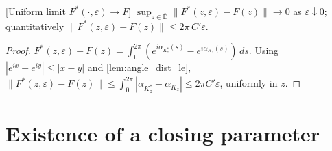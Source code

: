 \begin{lemma}

[Uniform limit $F^*(\cdot,\varepsilon)\to F$]
  \label{lem:arclength_error_tendsto}
  $\sup_{z\in\overline{\mathbb{D}}}\bigl\|F^*(z,\varepsilon)-F(z)\bigr\|\to 0$ as
  $\varepsilon\downarrow 0$; quantitatively
  $\|F^*(z,\varepsilon)-F(z)\|\le 2\pi\,C'\varepsilon$.
\end{lemma}
\begin{proof}
  $F^*(z,\varepsilon)-F(z)=\int_0^{2\pi}(e^{i\alpha_{K^*_z}(s)}-e^{i\alpha_{K_z}(s)})\,ds$.
  Using $|e^{ix}-e^{iy}|\le|x-y|$ and \cref{lem:angle_dist_le},
  $\|F^*(z,\varepsilon)-F(z)\|\le\int_0^{2\pi}|\alpha_{K^*_z}-\alpha_{K_z}|\le 2\pi C'\varepsilon$,
  uniformly in $z$.
\end{proof}

\section{Existence of a closing parameter}

